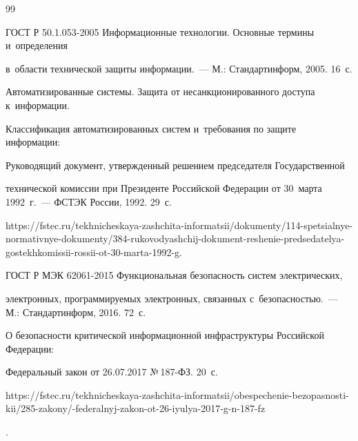 {\small\frenchspacing


{%




\begin{thebibliography}{99}





\vspace*{-2pt}







ГОСТ Р 50.1.053-2005 Информационные технологии. Основные термины и~определения 


в~об\-ласти технической защиты информации.~--- М.: Стандартинформ, 2005. 16~с.




Автоматизированные системы. Защита от несанкционированного доступа к~информации. 


Классификация автоматизированных систем и~требования по защите информации: 


Руководящий документ, утвержденный решением председателя Государственной 


технической комиссии при Президенте Российской Федерации от 30~марта 1992~г.~--- ФСТЭК России, 1992. 29~с.


{\sf https://fstec.ru/tekhnicheskaya-zashchita-informatsii/dokumenty/114-spetsialnye-normativnye-dokumenty/384-rukovodyashchij-dokument-reshenie-predsedatelya-gostekhkomissii-rossii-ot-30-marta-1992-g}.







ГОСТ Р МЭК 62061-2015 Функциональная безопас\-ность сис\-тем электрических, 


электронных, программируемых электронных, связанных с~безопасностью.~--- М.: Стандартинформ, 2016. 72~с.




О безопасности критической информационной инфраструктуры Российской Федерации: 


Федеральный закон от 26.07.2017 №\,187-ФЗ. 20~с.


{\sf  


https://fstec.\linebreak ru/tekhnicheskaya-zashchita-informatsii/obespechenie-bezopasnosti-kii/285-zakony/-federalnyj-zakon-ot-26-iyulya-2017-g-n-187-fz}.



\end{thebibliography}}}
